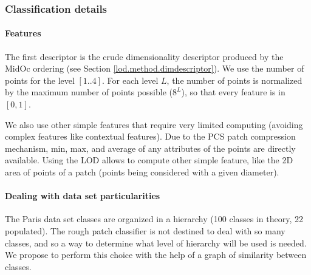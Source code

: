 		
		\subsubsection{Classification details}  
		\paragraph{Features}
		The first descriptor is the crude dimensionality descriptor produced by the MidOc ordering (see Section \ref{lod.method.dimdescriptor}).
		We use the number of points for the level $[1..4]$. For each level $L$, the number of points is normalized by the maximum number of points possible ($8^L$), so that every feature is in $[0,1]$.
		
		\label{lod.method.classification.other_feature}
		We also use other simple features that require very limited computing (avoiding complex features like contextual features). 
		Due to the PCS patch compression mechanism,
		min, max, and average of any attributes of the points are directly available.
		Using the LOD allows to compute other simple feature, like the 2D area of points of a patch (points being considered with a given diameter). 
		
		\paragraph{Dealing with data set particularities}
		The Paris data set classes are organized in a hierarchy (100 classes in theory, 22 populated).
		The rough patch classifier is not destined to deal with so many classes,
		and so a way to determine what level of hierarchy will be used is needed.
		We propose to perform this choice with the help of a graph of similarity between classes.

